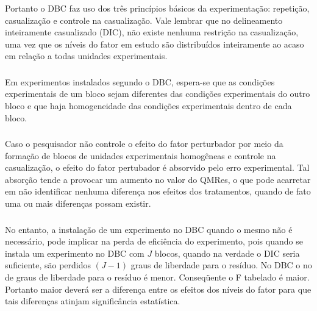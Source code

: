 \documentclass[14pt,aspectratio=1610]{beamer}
\begin{document}
\begin{frame}{}
\frametitle{}
\begin{block}{}
\justifying
Portanto o DBC faz uso dos três princípios básicos da experimentação: repetição, casualização e controle na casualização. Vale lembrar que no delineamento inteiramente casualizado (DIC), não existe nenhuma restrição na casualização, uma vez que os níveis do fator em estudo são distribuídos inteiramente ao acaso em relação a todas unidades experimentais.
\end{block}
\end{frame}

\begin{frame}{}
\frametitle{}
\begin{block}{}
\justifying
Em experimentos instalados segundo o DBC, espera-se que as condições experimentais de um bloco sejam diferentes das condições experimentais do outro bloco e que haja homogeneidade das condições experimentais dentro de cada bloco.
\end{block}
\end{frame}

\begin{frame}{}
\frametitle{}
\begin{block}{}
\justifying
Caso o pesquisador não controle o efeito do fator perturbador por meio da formação de blocos de unidades experimentais homogêneas e controle na casualização, o efeito do fator pertubador é absorvido pelo erro experimental. Tal absorção tende a provocar um aumento no valor do QMRes, o que pode acarretar em não identificar nenhuma diferença nos efeitos dos tratamentos, quando de fato uma ou mais diferenças possam existir.
\end{block}
\end{frame}

\begin{frame}{}
\frametitle{}
\begin{block}{}
\justifying
No entanto, a instalação de um experimento no DBC quando o mesmo não é
necessário, pode implicar na perda de eficiência do experimento, pois quando se instala um experimento no DBC com $J$ blocos, quando na verdade o DIC seria suficiente, são perdidos $(J-1)$ graus de liberdade para o resíduo. No DBC o no de graus de liberdade para o resíduo é menor. Conseqüente o F tabelado é maior. Portanto maior deverá ser a diferença entre os efeitos dos níveis do fator para que tais diferenças atinjam significância estatística.
\end{block}
\end{frame}
\end{document}
